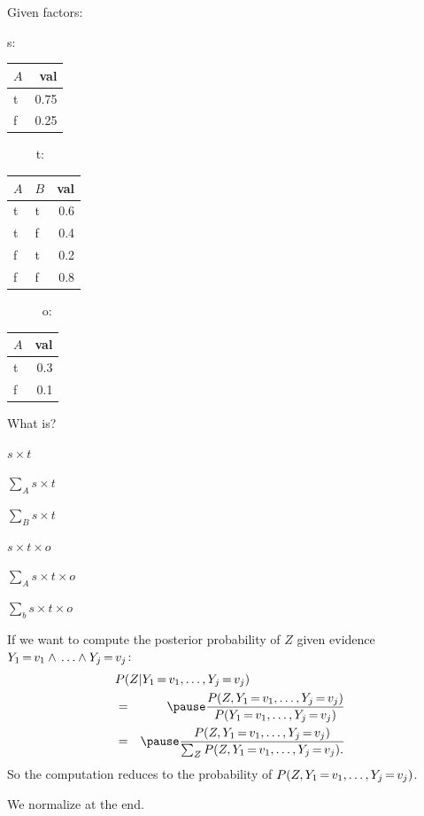 \documentclass[12pt]{beamer} %
\begin{document}
\begin{slide}
Given factors:

s: \begin{tabular}{|l|r|}
\hline
$A$ & val\\\hline
t &  0.75\\
f &  0.25\\\hline
\end{tabular}
~~~~
t: \begin{tabular}{|ll|r|}
\hline
$A$ &$B$ & val\\\hline
t & t & 0.6\\
t & f & 0.4\\
f & t & 0.2\\
f & f & 0.8\\
\hline
\end{tabular}
~~~~~
o: \begin{tabular}{|l|r|}
\hline
$A$ & val\\\hline
t &  0.3\\
f &  0.1\\\hline
\end{tabular}

What is?
\begin{enumeratea}
\item $s \times t$
\item $\sum_A s \times t$
\item $\sum_B s \times t$
\item  $s \times t \times o$
\item  $\sum_A s \times t \times o$
\item  $\sum_b s \times t \times o$
\end{enumeratea}
\end{slide}

\begin{slide}
If we want to compute the posterior probability of $Z$ given evidence
$Y_1{\,{=}\,}v_1\wedge \mbox{}\ldots\wedge \mbox{} Y_j{\,{=}\,}v_j$:
\begin{eqnarray*}
\lefteqn{P(Z|Y_1{\smeq}v_1,\ldots,Y_j{\smeq}v_j)}\\
  &=&\pause \frac{ P(Z,Y_1{\smeq}v_1,\ldots,Y_j{\smeq}v_j)}{P(Y_1{\smeq}v_1,\ldots,Y_j{\smeq}v_j)} \\
  &=&\pause \frac{ P(Z,Y_1{\smeq}v_1,\ldots,Y_j{\smeq}v_j)}{\sum_{Z} P(Z,Y_1{\smeq}v_1,\ldots,Y_j{\smeq}v_j).}
\end{eqnarray*}
So the computation reduces to the probability of
$P(Z,Y_1{\,{=}\,}v_1,\ldots,Y_j{\,{=}\,}v_j)$.

We normalize at the end.
\end{slide}
\end{document}
